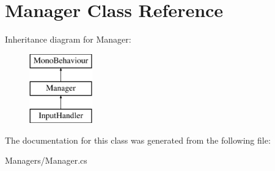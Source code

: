 \hypertarget{class_manager}{}\section{Manager Class Reference}
\label{class_manager}
Inheritance diagram for Manager\+:\begin{figure}[H]
\begin{center}
\leavevmode
\includegraphics[height=3.000000cm]{class_manager}
\end{center}
\end{figure}


The documentation for this class was generated from the following file\+:\begin{DoxyCompactItemize}
\item 
Managers/Manager.\+cs\end{DoxyCompactItemize}
